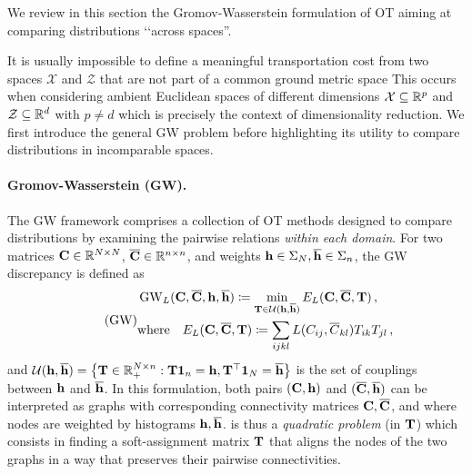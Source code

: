 We review in this section the Gromov-Wasserstein formulation of OT aiming at comparing distributions ‘‘across spaces''.

It is usually impossible to define a meaningful transportation cost from two spaces $\mathcal{X}$ and $\mathcal{Z}$ that are not part of a common ground metric space
This occurs when considering ambient Euclidean spaces of different dimensions \ie $\mathcal{X} \subseteq \mathbb{R}^p$ and $\mathcal{Z} \subseteq \mathbb{R}^d$ with $p \neq d$ which is precisely the context of dimensionality reduction.
We first introduce the general GW problem before highlighting its utility to compare distributions in incomparable spaces.

\paragraph{Gromov-Wasserstein (GW).} The GW framework \citep{memoli2011gromov,sturm2012space} comprises a collection of OT methods designed to compare distributions by examining the pairwise relations \emph{within each domain}. For two matrices ${\mathbf{C}} \in \mathbb{R}^{N \times N}$, $\overline{{\mathbf{C}}} \in \mathbb{R}^{n \times n}$, and weights ${\mathbf{h}} \in \Sigma_N, \overline{{\mathbf{h}}} \in \Sigma_n$, the GW discrepancy is defined as
\begin{equation}
\label{eq:gw_pb} 
\tag{GW}
\begin{split}
	&\operatorname{GW}_L ({\mathbf{C}}, \overline{{\mathbf{C}}}, {\mathbf{h}}, \overline{{\mathbf{h}}}) \coloneqq \min_{{\mathbf{T}} \in {\mathcal{U}}({\mathbf{h}}, \overline{{\mathbf{h}}})} E_L({\mathbf{C}}, \overline{{\mathbf{C}}}, {\mathbf{T}})\,, \\
	&\text{where} \quad E_L({\mathbf{C}}, \overline{{\mathbf{C}}}, {\mathbf{T}}) \coloneqq \sum_{ijkl}  L(C_{ij}, \overline{C}_{kl}) T_{ik} T_{jl}\,,
\end{split}
\end{equation}
and ${\mathcal{U}}({\mathbf{h}}, \overline{{\mathbf{h}}}) = \left\{ {\mathbf{T}} \in \mathbb{R}_+^{N \times n} : {\mathbf{T}} \bm{1}_n = {\mathbf{h}}, {\mathbf{T}}^\top \bm{1}_N = \overline{{\mathbf{h}}} \right\}$ is the set of couplings between ${\mathbf{h}}$ and $\overline{{\mathbf{h}}}$.
In this formulation, both pairs $({\mathbf{C}}, {\mathbf{h}})$ and $(\overline{{\mathbf{C}}}, \overline{{\mathbf{h}}})$ can be interpreted as graphs with corresponding connectivity matrices ${\mathbf{C}}, \overline {{\mathbf{C}}}$, and where nodes are weighted by histograms ${\mathbf{h}}, \overline {{\mathbf{h}}}$.  is thus a \emph{quadratic problem} (in ${\mathbf{T}}$) which consists in finding a soft-assignment matrix ${\mathbf{T}}$ that aligns the nodes of the two graphs in a way that preserves their pairwise connectivities. 

